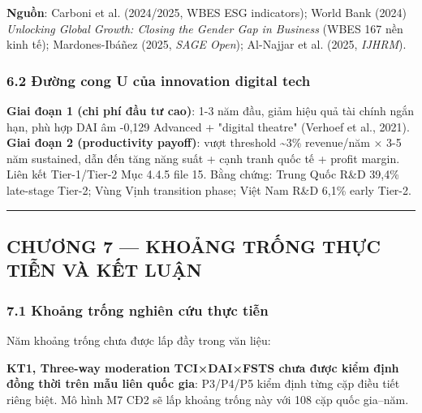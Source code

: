 \documentclass[12pt,a4paper]{article}
\begin{document}
\textbf{Nguồn}: Carboni et al. (2024/2025, WBES ESG indicators); World
Bank (2024) \emph{Unlocking Global Growth: Closing the Gender Gap in
Business} (WBES 167 nền kinh tế); Mardones-Ibáñez (2025, \emph{SAGE
Open}); Al-Najjar et al. (2025, \emph{IJHRM}).

\hypertarget{62-ux111ux1b0ux1eddng-cong-u-cux1ee7a-innovation-digital-tech}{%
\subsubsection{6.2 Đường cong U của innovation digital
tech}\label{62-ux111ux1b0ux1eddng-cong-u-cux1ee7a-innovation-digital-tech}}

\textbf{Giai đoạn 1 (chi phí đầu tư cao)}: 1-3 năm đầu, giảm hiệu quả
tài chính ngắn hạn, phù hợp DAI âm -0,129 Advanced + "digital theatre"
(Verhoef et al., 2021). \textbf{Giai đoạn 2 (productivity payoff)}: vượt
threshold \textasciitilde3\% revenue/năm × 3-5 năm sustained, dẫn đến
tăng năng suất + cạnh tranh quốc tế + profit margin. Liên kết
Tier-1/Tier-2 Mục 4.4.5 file 15. Bằng chứng: Trung Quốc R\&D 39,4\%
late-stage Tier-2; Vùng Vịnh transition phase; Việt Nam R\&D 6,1\% early
Tier-2.

\begin{center}\rule{0.5\linewidth}{0.5pt}\end{center}

\hypertarget{chux1b0ux1a1ng-7--khoux1ea3ng-trux1ed1ng-thux1ef1c-tiux1ec5n-vuxe0-kux1ebft-luux1eadn}{%
\subsection{CHƯƠNG 7 --- KHOẢNG TRỐNG THỰC TIỄN VÀ KẾT
LUẬN}\label{chux1b0ux1a1ng-7--khoux1ea3ng-trux1ed1ng-thux1ef1c-tiux1ec5n-vuxe0-kux1ebft-luux1eadn}}

\hypertarget{71-khoux1ea3ng-trux1ed1ng-nghiuxean-cux1ee9u-thux1ef1c-tiux1ec5n}{%
\subsubsection{7.1 Khoảng trống nghiên cứu thực
tiễn}\label{71-khoux1ea3ng-trux1ed1ng-nghiuxean-cux1ee9u-thux1ef1c-tiux1ec5n}}

Năm khoảng trống chưa được lấp đầy trong văn liệu:

\textbf{KT1, Three-way moderation TCI×DAI×FSTS chưa được kiểm định đồng
thời trên mẫu liên quốc gia}: P3/P4/P5 kiểm định từng cặp điều tiết
riêng biệt. Mô hình M7 CĐ2 sẽ lấp khoảng trống này với 108 cặp quốc
gia--năm.
\end{document}

